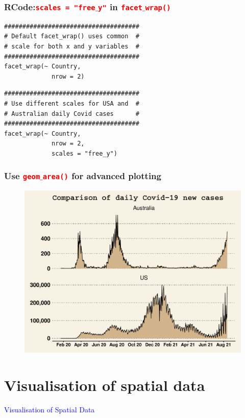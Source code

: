 \documentclass{beamer}
\begin{document}
\begin{frame}[fragile]\frametitle{RCode:\texttt{\textcolor{red}{scales = "free$\_$y"}} in \texttt{\textcolor{red}{facet$\_$wrap()}}}
\begin{lstlisting}
#####################################
# Default facet_wrap() uses common  #
# scale for both x and y variables  #
#####################################
facet_wrap(~ Country, 
             nrow = 2) 
\end{lstlisting}

\begin{lstlisting}
#####################################
# Use different scales for USA and  #
# Australian daily Covid cases      #
#####################################   
facet_wrap(~ Country, 
             nrow = 2,
             scales = "free_y") 
\end{lstlisting}
\end{frame}

\begin{frame}\frametitle{Use \texttt{\textcolor{red}{geom$\_$area()}} for advanced plotting}
\begin{figure}
\includegraphics[width=0.99\linewidth]{PlotsLec4/Cov19USA_AusAreaplt}
\end{figure}
\end{frame}


\section{Visualisation of spatial data}

\begin{frame}
\centering 
{\Large \textcolor{blue}{Visualisation of Spatial Data}}
\end{frame}
\end{document}

